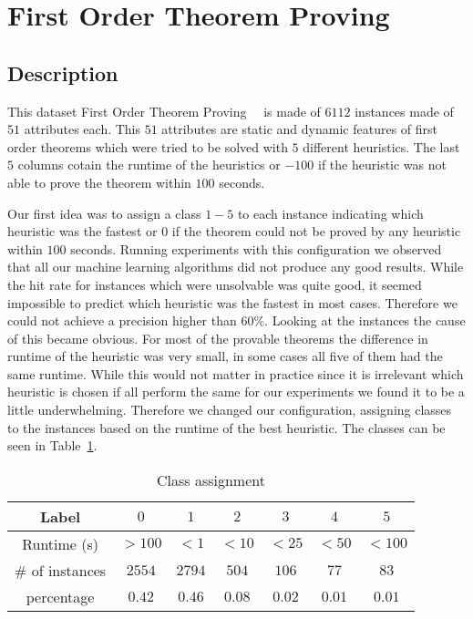 \section{First Order Theorem Proving}
\label{db:sec:ds2}
\subsection{Description}
This dataset First Order Theorem Proving~\cite{ds2:uci}~\cite{ds2:paper} is made of $6112$ instances made of $51$ attributes each. This $51$ attributes are static and dynamic features of first order theorems which were tried to be solved with $5$ different heuristics. The last $5$ columns cotain the runtime of the heuristics or $-100$ if the heuristic was not able to prove the theorem within $100$ seconds.\par
Our first idea was to assign a class $1-5$ to each instance indicating which heuristic was the fastest or $0$ if the theorem could not be proved by any heuristic within $100$ seconds. Running experiments with this configuration we observed that all our machine learning algorithms did not produce any good results. While the hit rate for instances which were unsolvable was quite good, it seemed impossible to predict which heuristic was the fastest in most cases. Therefore we could not achieve a precision higher than $60\%$.
Looking at the instances the cause of this became obvious. For most of the provable theorems the difference in runtime of the heuristic was very small, in some cases all five of them had the same runtime. While this would not matter in practice since it is irrelevant which heuristic is chosen if all perform the same for our experiments we found it to be a little underwhelming. Therefore we changed our configuration, assigning classes to the instances based on the runtime of the best heuristic. The classes can be seen in Table~\ref{ds2:table:classes}.
\begin{table}[h]
	\begin{center}
	\begin{tabular}{c|c|c|c|c|c|c}

		Label & $0$ & $1$ & $2$ & $3$ & $4$ & $5$\\\hline
		Runtime (s) & $>100$ & $<1$ & $<10$ & $<25$ & $<50$ &$<100$\\\hline
		$\#$ of instances & $2554$ & $2794$ & $504$ & $106$ & $77$ & $83$\\\hline
		percentage & $0.42$ & $0.46$ & $0.08$ & $0.02$ & $0.01$ & $0.01$\\\hline

	\end{tabular}
\end{center}
	\caption{Class assignment \label{ds2:table:classes}}
\end{table}
